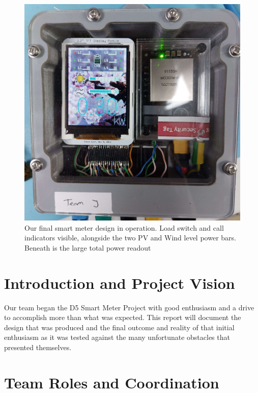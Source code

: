 \documentclass[9pt, technote, a4paper, nofonttune]{IEEEphot}
\begin{document}
\begin{figure}[h!]
    \centering
    \includegraphics[width=35pc]{D5/SmartMeter1.jpg}
    \caption{Our final smart meter design in operation.  Load switch and call indicators visible, alongside the two PV and  Wind level power bars.  Beneath is the large total power readout}
\end{figure}

        

\newpage
\section{Introduction and Project Vision}
\hspace{0.5cm}Our team began the D5 Smart Meter Project with good enthusiasm and a drive to accomplish more than what was expected.  This report will document the design that was produced and the final outcome and reality of that initial enthusiasm as it was tested against the many unfortunate obstacles that presented themselves.

\section{Team Roles and Coordination}
\end{document}
